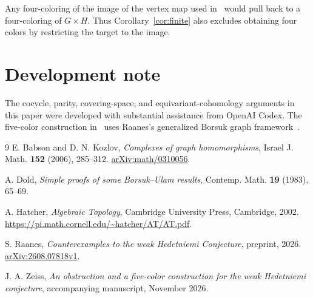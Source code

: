 \documentclass[11pt]{amsart}
\theoremstyle{remark}
\numberwithin{equation}{section}
\begin{document}
Any four-coloring of the image of the vertex map used in~\cite{Companion} would pull back to a four-coloring of $G\times H$. Thus Corollary~\ref{cor:finite} also excludes obtaining four colors by restricting the target to the image.

\section*{Development note}
The cocycle, parity, covering-space, and equivariant-cohomology arguments in this paper were developed with substantial assistance from OpenAI Codex. The five-color construction in~\cite{Companion} uses Raanes's generalized Borsuk graph framework~\cite{Raanes}.

\begin{thebibliography}{9}
E. Babson and D. N. Kozlov,
\emph{Complexes of graph homomorphisms},
Israel J. Math. \textbf{152} (2006), 285--312.
\href{https://arxiv.org/abs/math/0310056}{arXiv:math/0310056}.

A. Dold,
\emph{Simple proofs of some Borsuk--Ulam results},
Contemp. Math. \textbf{19} (1983), 65--69.

A. Hatcher,
\emph{Algebraic Topology},
Cambridge University Press, Cambridge, 2002.
\url{https://pi.math.cornell.edu/~hatcher/AT/AT.pdf}.

S. Raanes,
\emph{Counterexamples to the weak Hedetniemi Conjecture},
preprint, 2026.
\href{https://arxiv.org/abs/2608.07818v1}{arXiv:2608.07818v1}.

J. A. Zeiss,
\emph{An obstruction and a five-color construction for the weak Hedetniemi conjecture},
accompanying manuscript, November 2026.
\end{thebibliography}
\end{document}
